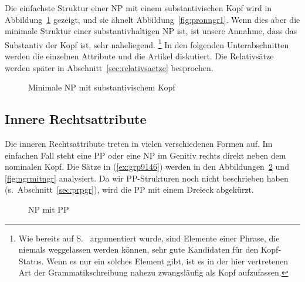 Die einfachste Struktur einer NP mit einem substantivischen Kopf wird in Abbildung~\ref{fig:ngreinf} gezeigt, und sie ähnelt Abbildung~\ref{fig:pronngr1}.
Wenn dies aber die minimale Struktur einer substantivhaltigen NP ist, ist unsere Annahme, dass das Substantiv der Kopf ist, sehr naheliegend.%
\footnote{Wie bereits auf S.~\pageref{abs:kopfnichtweglassbar} argumentiert wurde, sind Elemente einer Phrase, die niemals weggelassen werden können, sehr gute Kandidaten für den Kopf-Status.
Wenn es nur ein solches Element gibt, ist es in der hier vertretenen Art der Grammatikschreibung nahezu zwangsläufig als Kopf aufzufassen.}
In den folgenden Unterabschnitten werden die einzelnen Attribute und die Artikel diskutiert.
Die Relativsätze werden später in Abschnitt~\ref{sec:relativsaetze} besprochen.

\begin{figure}
  \centering
  \caption{Minimale NP mit substantivischem Kopf}
  \label{fig:ngreinf}
\end{figure}

\subsection{Innere Rechtsattribute}

\label{sec:innererechtsattribute}

Die inneren Rechtsattribute treten in vielen verschiedenen Formen auf.
Im einfachen Fall steht eine PP oder eine NP im Genitiv rechts direkt neben dem nominalen Kopf.
Die Sätze in (\ref{ex:grp9146}) werden in den Abbildungen~\ref{fig:ngrmitprpgr} und \ref{fig:ngrmitngr} analysiert.
Da wir PP-Strukturen noch nicht beschrieben haben (s.\ Abschnitt~\ref{sec:prpgr}), wird die PP mit einem Dreieck abgekürzt.

\begin{exe}
  \ex\label{ex:grp9146}
  \begin{xlist}
  \end{xlist}
\end{exe}

\begin{figure}
  \centering
  \caption{NP mit PP}
  \label{fig:ngrmitprpgr}
\end{figure}

